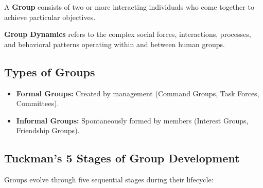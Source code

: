 \documentclass[11pt,a4paper]{article}
\begin{document}
A \textbf{Group} consists of two or more interacting individuals who come together to achieve particular objectives.

\begin{tcolorbox}[defbox, title={Concept of Group Dynamics}]
  \textbf{Group Dynamics} refers to the complex social forces, interactions, processes, and behavioral patterns operating within and between human groups.
\end{tcolorbox}

\subsection{Types of Groups}
\begin{itemize}[leftmargin=*, itemsep=3pt]
  \item \textbf{Formal Groups:} Created by management (Command Groups, Task Forces, Committees).
  \item \textbf{Informal Groups:} Spontaneously formed by members (Interest Groups, Friendship Groups).
\end{itemize}

\subsection{Tuckman's 5 Stages of Group Development}
Groups evolve through five sequential stages during their lifecycle:

\begin{tcolorbox}[tikzbox, title={Tuckman's 5 Stages of Group Development}]
\centering
{}
\end{tcolorbox}
\end{document}
